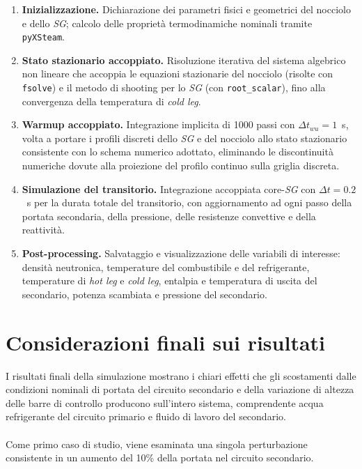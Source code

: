 \documentclass[12pt]{report}
\begin{document}
\begin{enumerate}
    \item \textbf{Inizializzazione.} Dichiarazione dei parametri fisici e 
    geometrici del nocciolo e dello \textit{SG}; calcolo delle proprietà 
    termodinamiche nominali tramite \texttt{pyXSteam}.

    \item \textbf{Stato stazionario accoppiato.} Risoluzione iterativa del sistema 
    algebrico non lineare che accoppia le equazioni stazionarie del nocciolo 
    (risolte con \texttt{fsolve}) e il metodo di shooting per lo \textit{SG} 
    (con \texttt{root\_scalar}), fino alla convergenza della temperatura di 
    \textit{cold leg}.

    \item \textbf{Warmup accoppiato.} Integrazione implicita di 1000 passi con 
    $\Delta t_{wu} = 1$~s, volta a portare i profili discreti dello \textit{SG} 
    e del nocciolo allo stato stazionario consistente con lo schema numerico 
    adottato, eliminando le discontinuità numeriche dovute alla proiezione del 
    profilo continuo sulla griglia discreta.

    \item \textbf{Simulazione del transitorio.} Integrazione accoppiata 
    core-\textit{SG} con $\Delta t = 0.2$~s per la durata totale del transitorio, 
    con aggiornamento ad ogni passo della portata secondaria, della pressione, 
    delle resistenze convettive e della reattività.

    \item \textbf{Post-processing.} Salvataggio e visualizzazione delle variabili 
    di interesse: densità neutronica, temperature del combustibile e del 
    refrigerante, temperature di \textit{hot leg} e \textit{cold leg}, entalpia 
    e temperatura di uscita del secondario, potenza scambiata e pressione del 
    secondario.
\end{enumerate}



\chapter{Considerazioni finali sui risultati}
I risultati finali della simulazione mostrano i chiari effetti che gli scostamenti dalle condizioni nominali di portata del circuito secondario e della variazione di altezza delle barre di controllo producono sull'intero sistema, comprendente acqua refrigerante del circuito primario e fluido di lavoro del secondario.\\\\
Come primo caso di studio, viene esaminata una singola perturbazione consistente in un aumento del 10\% della portata nel circuito secondario.
\end{document}
